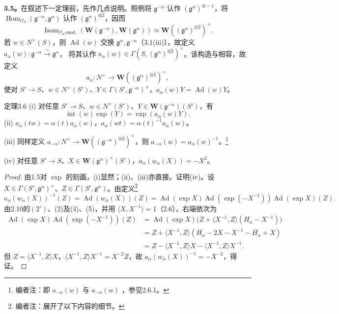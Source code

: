 \textbf{3.5。}在叙述下一定理前，先作几点说明。照例将 $\mathfrak g^{-\alpha}$ 认作 $(\mathfrak g^\alpha)^{\otimes-1}$，将 $\operatorname{Hom}_{\mathscr O_S}(\mathfrak g^{-\alpha},\mathfrak g^\alpha)$ 认作 $(\mathfrak g^\alpha)^{\otimes2}$，因而
\[\operatorname{Isom}_{\mathscr O_S\text{-mod.}}(\mathbf W(\mathfrak g^{-\alpha}),\mathbf W(\mathfrak g^\alpha))\simeq\mathbf W((\mathfrak g^\alpha)^{\otimes2})^\times.\]
若 $w\in N^\times(S)$，则 $\operatorname{Ad}(w)$ 交换 $\mathfrak g^\alpha,\mathfrak g^{-\alpha}$（3.1(iii)），故定义 $a_\alpha(w):\mathfrak g^{-\alpha}\xrightarrow\sim\mathfrak g^\alpha$，
将其认作 $a_\alpha(w)\in\Gamma(S,(\mathfrak g^\alpha)^{\otimes2})^\times$。该构造与相容，故定义
\[a_\alpha:N^\times\longrightarrow\mathbf W((\mathfrak g^\alpha)^{\otimes2})^\times,\]
使对 $S'\to S$、$w\in N^\times(S')$、$Y\in\Gamma(S',\mathfrak g^{-\alpha})^\times$，$a_\alpha(w)Y=\operatorname{Ad}(w)Y$。
\begin{SGAresult}{定理}{3.6}
(i) 对任意 $S'\to S$、$w\in N^\times(S')$、$Y\in\mathbf W(\mathfrak g^{-\alpha})(S')$，有
\[\operatorname{int}(w)\exp(Y)=\exp(a_\alpha(w)Y).\]
(ii) $a_\alpha(tw)=\alpha(t)a_\alpha(w)$，$a_\alpha(wt)=\alpha(t)^{-1}a_\alpha(w)$。

(iii) 同样定义 $a_{-\alpha}:N^\times\to\mathbf W((\mathfrak g^{-\alpha})^{\otimes2})^\times$，则 $a_{-\alpha}(w)=a_\alpha(w)^{-1}$。\footnote{编者注：即 $a_{-\alpha}(w)$ 与 $a_{-\alpha}(w)$ ，参见2.6.1。}

(iv) 对任意 $S'\to S$、$X\in\mathbf W(\mathfrak g^\alpha)^\times(S')$，$a_\alpha(w_\alpha(X))=-X^2$。
\end{SGAresult}
\begin{proof}
由1.5对 $\exp$ 的刻画，(i)显然；(ii)、(iii)亦直接。证明(iv)。设 $X\in\Gamma(S',\mathfrak g^\alpha)^\times$、$Z\in\Gamma(S',\mathfrak g^\alpha)$。由定义\footnote{编者注：展开了以下内容的细节。}
\[a_\alpha(w_\alpha(X))^{-1}(Z)=\operatorname{Ad}(w_\alpha(X))(Z)=\operatorname{Ad}(\exp X)\operatorname{Ad}(\exp(-X^{-1}))\operatorname{Ad}(\exp X)(Z).\]
由2.10的$(2')$、(2)及(4)、(5)，并用 $\langle X,X^{-1}\rangle=1$（2.6），右端依次为
\[\begin{aligned}\operatorname{Ad}(\exp X)\operatorname{Ad}(\exp(-X^{-1}))(Z)&=\operatorname{Ad}(\exp X)\bigl(Z+\langle X^{-1},Z\rangle(H_\alpha-X^{-1})\bigr)\\&=Z+\langle X^{-1},Z\rangle(H_\alpha-2X-X^{-1}-H_\alpha+X)\\&=Z-\langle X^{-1},Z\rangle X-\langle X^{-1},Z\rangle X^{-1}.\end{aligned}\]
但 $Z=\langle X^{-1},Z\rangle X$，$\langle X^{-1},Z\rangle X^{-1}=X^{-2}Z$，故 $a_\alpha(w_\alpha(X))^{-1}=-X^{-2}$，得证。
\end{proof}
